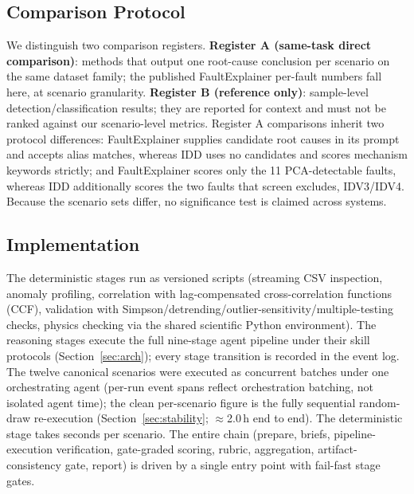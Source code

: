 \documentclass[preprint,12pt]{elsarticle}
\begin{document}
\subsection{Comparison Protocol}
We distinguish two comparison registers. \textbf{Register A (same-task direct comparison)}: methods that output one root-cause conclusion per scenario on the same dataset family; the published FaultExplainer per-fault numbers fall here, at scenario granularity. \textbf{Register B (reference only)}: sample-level detection/classification results; they are reported for context and must not be ranked against our scenario-level metrics. Register A comparisons inherit two protocol differences: FaultExplainer supplies candidate root causes in its prompt and accepts alias matches, whereas IDD uses no candidates and scores mechanism keywords strictly; and FaultExplainer scores only the 11 PCA-detectable faults, whereas IDD additionally scores the two faults that screen excludes, IDV3/IDV4. Because the scenario sets differ, no significance test is claimed across systems.

\subsection{Implementation}
The deterministic stages run as versioned scripts (streaming CSV inspection, anomaly profiling, correlation with lag-compensated cross-correlation functions (CCF), validation with Simpson/detrending/outlier-sensitivity/multiple-testing checks, physics checking via the shared scientific Python environment). The reasoning stages execute the full nine-stage agent pipeline under their skill protocols (Section~\ref{sec:arch}); every stage transition is recorded in the event log. The twelve canonical scenarios were executed as concurrent batches under one orchestrating agent (per-run event spans reflect orchestration batching, not isolated agent time); the clean per-scenario figure is the fully sequential random-draw re-execution (Section~\ref{sec:stability}; $\approx$2.0\,h end to end). The deterministic stage takes seconds per scenario. The entire chain (prepare, briefs, pipeline-execution verification, gate-graded scoring, rubric, aggregation, artifact-consistency gate, report) is driven by a single entry point with fail-fast stage gates.\medskip
\end{document}
